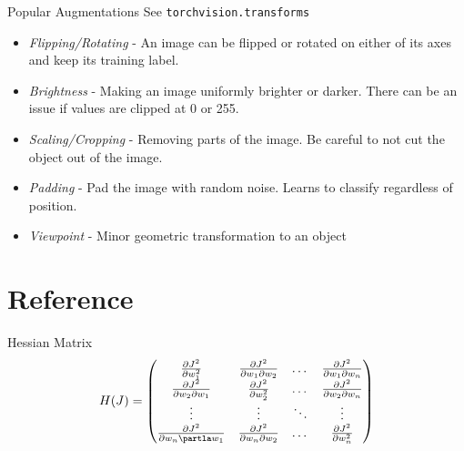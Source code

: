 \documentclass[11pt,a4paper]{article}
\begin{document}
\begin{proposition}{Popular Augmentations}
  See \texttt{torchvision.transforms}
  \begin{itemize}
    \item \textit{Flipping/Rotating} - An image can be flipped or rotated on either of its axes and keep its training label.
    \item \textit{Brightness} - Making an image uniformly brighter or darker. There can be an issue if values are clipped at 0 or 255.
    \item \textit{Scaling/Cropping} - Removing parts of the image. Be careful to not cut the object out of the image.
    \item \textit{Padding} - Pad the image with random noise. Learns to classify regardless of position.
    \item \textit{Viewpoint} - Minor geometric transformation to an object
  \end{itemize}
\end{proposition}

\newpage
\setcounter{section}{-1}
\section{Reference}

\begin{definition}{Hessian Matrix}
  \[ H(J)=\begin{pmatrix}\frac{\partial J^2}{\partial w_1^2}&\frac{\partial J^2}{\partial w_1\partial w_2}&\dots&\frac{\partial J^2}{\partial w_1\partial w_n}\\\frac{\partial J^2}{\partial w_2\partial w_1}&\frac{\partial J^2}{\partial w_2^2}&\dots&\frac{\partial J^2}{\partial w_2\partial w_n}\\\vdots&\vdots&\ddots&\vdots\\\frac{\partial J^2}{\partial w_n\partla w_1}&\frac{\partial J^2}{\partial w_n\partial w_2}&\dots&\frac{\partial J^2}{\partial w_n^2}\end{pmatrix}\]
\end{definition}
\end{document}
